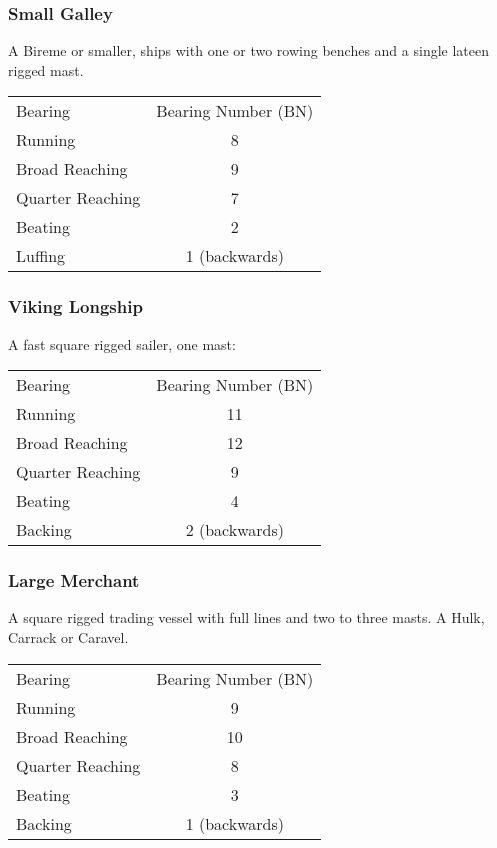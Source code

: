 \documentclass[11pt]{wbzine}
\begin{document}
\begin{multicols}{2}
\subsubsection{Small Galley}

A Bireme or smaller, ships with one or two rowing benches and a single
lateen rigged mast.

\begin{tabularx}{\columnwidth}{Zc}
Bearing & Bearing Number (BN) \\
Running & 8 \\
Broad Reaching & 9 \\
Quarter Reaching & 7 \\
Beating & 2 \\
Luffing & 1 (backwards) \\
\end{tabularx}

\subsubsection{Viking Longship}

A fast square rigged sailer, one mast:


\begin{tabularx}{\columnwidth}{Zc}
Bearing & Bearing Number (BN) \\
Running & 11 \\
Broad Reaching & 12 \\
Quarter Reaching & 9 \\
Beating & 4 \\
Backing & 2 (backwards) \\
\end{tabularx}

\subsubsection{Large Merchant}

A square rigged trading vessel with full lines and two to three masts. A
Hulk, Carrack or Caravel.


\begin{tabularx}{\columnwidth}{Zc}
Bearing & Bearing Number (BN) \\
Running & 9 \\
Broad Reaching & 10 \\
Quarter Reaching & 8 \\
Beating & 3 \\
Backing & 1 (backwards) \\
\end{tabularx}


\end{multicols}
\end{document}
